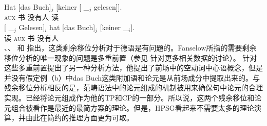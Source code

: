 \eal
\ex 
\gll {}Hat [das Buch]$_j$ [keiner [ \_$_j$ gelesen]].\\
	{}\textsc{aux} \spacebr{} 书 \spacebr{}没有人 \spacebr{}{} {} 读\\
\ex 
\gll {}[ \_$_j$ Gelesen]$_i$ hat [das Buch]$_j$ [keiner \_$_i$].\\
	{}\spacebr{}{} {} 读 \textsc{aux} \spacebr{} 书 \spacebr{}没有人\\
\zl
 \citet[]{Haider93a}、\citet[Abschnitt~]{deKuthy2002a}、 
 \citet[第2节]{dKM2001a}和 \citet{Fanselow2002a}指出，这类剩余移位分析对于德语是有问题的。Fanselow所指的需要剩余移位分析的唯一现象的问题是多重前置（参见 
针对更多相关数据的讨论）。 \citet{Mueller2005c,Mueller2005d,MuellerGS}针对这些多重前置提出了另一种分析方法，他提出了前场中的空动词中心语概念，但是并没有假定例（b）中das Buch这类附加语和论元是从前场成分中提取出来的。与残余移位分析相反的是，范畴语法\citep{Geach70a,HN94a}中的论元组成的机制被用来确保句中论元的合理实现。\citet[]{Chomsky2007a}已经将论元组成作为他的TP和CP的一部分。所以说，这两个残余移位和论元组合被看作是最近的最简方案的理论。但是，HPSG看起来不需要太多的理论演算，并由此在简约的推理方面更为可取。


